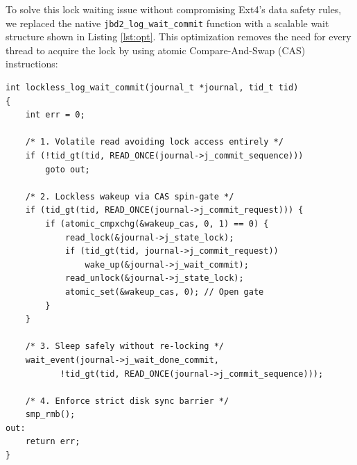 To solve this lock waiting issue without compromising Ext4's data safety rules, we replaced the native \texttt{jbd2\_log\_wait\_commit} function with a scalable wait structure shown in Listing \ref{lst:opt}. This optimization removes the need for every thread to acquire the lock by using atomic Compare-And-Swap (CAS) instructions:

\begin{lstlisting}[caption={Optimized CAS Lockless Implementation}, label={lst:opt}]
int lockless_log_wait_commit(journal_t *journal, tid_t tid)
{
    int err = 0;
    
    /* 1. Volatile read avoiding lock access entirely */
    if (!tid_gt(tid, READ_ONCE(journal->j_commit_sequence)))
        goto out;

    /* 2. Lockless wakeup via CAS spin-gate */
    if (tid_gt(tid, READ_ONCE(journal->j_commit_request))) {
        if (atomic_cmpxchg(&wakeup_cas, 0, 1) == 0) {
            read_lock(&journal->j_state_lock);
            if (tid_gt(tid, journal->j_commit_request))
                wake_up(&journal->j_wait_commit);
            read_unlock(&journal->j_state_lock);
            atomic_set(&wakeup_cas, 0); // Open gate
        }
    }

    /* 3. Sleep safely without re-locking */
    wait_event(journal->j_wait_done_commit,
           !tid_gt(tid, READ_ONCE(journal->j_commit_sequence)));
           
    /* 4. Enforce strict disk sync barrier */
    smp_rmb();
out:
    return err;
}
\end{lstlisting}

